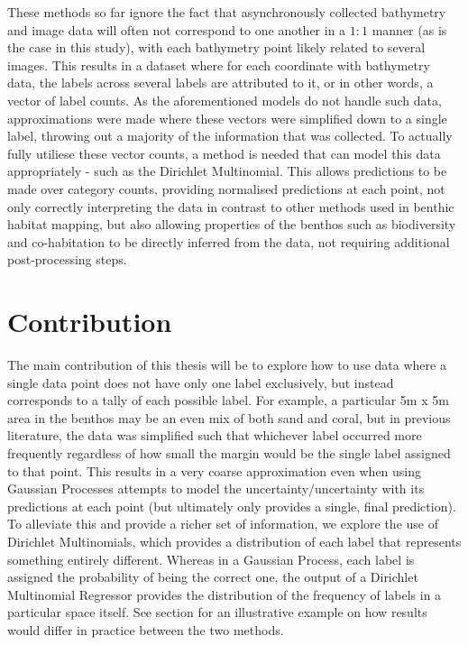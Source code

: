 These methods so far ignore the fact that asynchronously collected bathymetry and image data will often not correspond to one another in a $1:1$ manner (as is the case in this study), with each bathymetry point likely related to several images. This results in a dataset where for each coordinate with bathymetry data, the labels across several labels are attributed to it, or in other words, a vector of label counts. As the aforementioned models do not handle such data, approximations were made where these vectors were simplified down to a single label, throwing out a majority of the information that was collected. To actually fully utiliese these vector counts, a method is needed that can model this data appropriately - such as the Dirichlet Multinomial. This allows predictions to be made over category counts, providing normalised predictions at each point, not only correctly interpreting the data in contrast to other methods used in benthic habitat mapping, but also allowing properties of the benthos such as biodiversity and co-habitation to be directly inferred from the data, not requiring additional post-processing steps.


\section{Contribution}

 The main contribution of this thesis will be to explore how to use data where a single data point does not have only one label exclusively, but instead corresponds to a tally of each possible label. For example, a particular 5m x 5m area in the benthos may be an even mix of both sand and coral, but in previous literature, the data was simplified such that whichever label occurred more frequently regardless of how small the margin would be the single label assigned to that point. This results in a very coarse approximation even when using Gaussian Processes attempts to model the uncertainty/uncertainty with its predictions at each point (but ultimately only provides a single, final prediction). To alleviate this and provide a richer set of information, we explore the use of Dirichlet Multinomials, which provides a distribution of each label that represents something entirely different. Whereas in a Gaussian Process, each label is assigned the probability of being the correct one, the output of a Dirichlet Multinomial Regressor provides the distribution of the frequency of labels in a particular space itself. See section  for an illustrative example on how results would differ in practice between the two methods.

